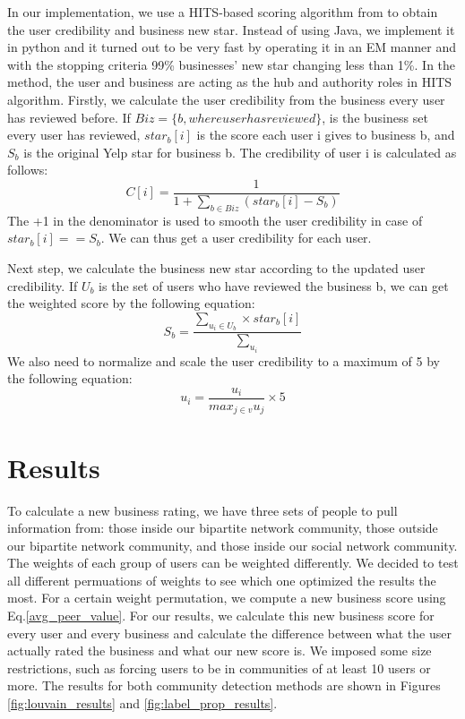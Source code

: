 \documentclass[10pt]{article}
\begin{document}
In our implementation, we use a HITS-based scoring algorithm from \cite{StanfordCS224wYelp} to obtain the user credibility and business new star. Instead of using Java, we implement it in python and it turned out to be very fast by operating it in an EM manner and with the stopping criteria 99\% businesses' new star changing less than 1\%. In the method, the user and business are acting as the hub and authority roles in HITS algorithm. Firstly, we calculate the user credibility from the business every user has reviewed before. If $Biz=\{b, where user has reviewed\}$, is the business set every user has reviewed, $star_{b}[i]$ is the score each user i gives to business b, and $S_{b}$ is the original Yelp star for business b. The credibility of user i is calculated as follows: 
\begin{equation*}
C[i] = \frac{1}{1+\sum\nolimits_{b \in Biz} (star_{b}[i]-S_{b})}
\end{equation*}
The +1 in the denominator is used to smooth the user credibility in case of $star_{b}[i]==S_{b}$. We can thus get a user credibility for each user. \par 
Next step, we calculate the business new star according to the updated user credibility. If $U_{b}$ is the set of users who have reviewed the business b, we can get the weighted score by the following equation:
\begin{equation*}
S_{b} = \frac{\sum\nolimits_{u_{i}\in U_{b}}\times star_{b}[i]}{\sum\nolimits_{u_{i}}}
\end{equation*}
We also need to normalize and scale the user credibility to a maximum of 5 by the following equation:
\begin{equation*}
u_{i} = \frac{u_{i}}{max_{j\in v}u_{j}}\times 5
\end{equation*}

\section{Results}
\label{sec:results}

To calculate a new business rating, we have three sets of people to pull information from: those inside our bipartite network community, those outside our bipartite network community, and those inside our social network community.  The weights of each group of users can be weighted differently.  We decided to test all different permuations of weights to see which one optimized the results the most.  For a certain weight permutation, we compute a new business score using Eq.\ref{avg_peer_value}.  For our results, we calculate this new business score for every user and every business and calculate the difference between what the user actually rated the business and what our new score is.  We imposed some size restrictions, such as forcing users to be in communities of at least 10 users or more.  The results for both community detection methods are shown in Figures \ref{fig:louvain_results} and \ref{fig:label_prop_results}.
\end{document}
